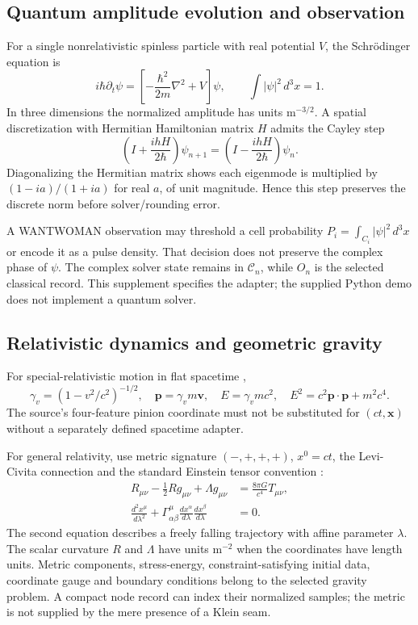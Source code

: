 \documentclass[11pt,a4paper]{article}
\numberwithin{equation}{section}
\begin{document}
\subsection{Quantum amplitude evolution and observation}
For a single nonrelativistic spinless particle with real potential $V$, the Schr\"odinger equation is \cite[Sec.~16--5]{quantum}
\begin{equation}
i\hbar\partial_t\psi=
\left[-\frac{\hbar^2}{2m}\nabla^2+V\right]\psi,
\qquad\int |\psi|^2\,d^3x=1.
\end{equation}
In three dimensions the normalized amplitude has units $\mathrm{m^{-3/2}}$. A spatial discretization with Hermitian Hamiltonian matrix $H$ admits the Cayley step
\begin{equation}
\left(I+\frac{ihH}{2\hbar}\right)\psi_{n+1}
=\left(I-\frac{ihH}{2\hbar}\right)\psi_n.
\end{equation}
Diagonalizing the Hermitian matrix shows each eigenmode is multiplied by $(1-ia)/(1+ia)$ for real $a$, of unit magnitude. Hence this step preserves the discrete norm before solver/rounding error.

A WANTWOMAN observation may threshold a cell probability
$P_i=\int_{C_i}|\psi|^2\,d^3x$ or encode it as a pulse density. That decision does not preserve the complex phase of $\psi$. The complex solver state remains in $\mathcal C_n$, while $O_n$ is the selected classical record. This supplement specifies the adapter; the supplied Python demo does not implement a quantum solver.

\subsection{Relativistic dynamics and geometric gravity}
For special-relativistic motion in flat spacetime \cite[Ch.~15]{relativity},
\begin{equation}
\gamma_v=(1-v^2/c^2)^{-1/2},\quad
\bm p=\gamma_v m\bm v,\quad E=\gamma_v mc^2,\quad
E^2=c^2\bm p\cdot\bm p+m^2c^4.
\end{equation}
The source's four-feature pinion coordinate must not be substituted for $(ct,\bm x)$ without a separately defined spacetime adapter.

For general relativity, use metric signature $(-,+,+,+)$, $x^0=ct$, the Levi-Civita connection and the standard Einstein tensor convention \cite[Secs.~3--4]{carroll}:
\begin{align}
R_{\mu\nu}-\tfrac12Rg_{\mu\nu}+\Lambda g_{\mu\nu}
&=\frac{8\pi G}{c^4}T_{\mu\nu},\\
\frac{d^2x^\mu}{d\lambda^2}+\Gamma^\mu_{\alpha\beta}
\frac{dx^\alpha}{d\lambda}\frac{dx^\beta}{d\lambda}&=0.
\end{align}
The second equation describes a freely falling trajectory with affine parameter $\lambda$. The scalar curvature $R$ and $\Lambda$ have units $\mathrm{m^{-2}}$ when the coordinates have length units. Metric components, stress-energy, constraint-satisfying initial data, coordinate gauge and boundary conditions belong to the selected gravity problem. A compact node record can index their normalized samples; the metric is not supplied by the mere presence of a Klein seam.
\end{document}
